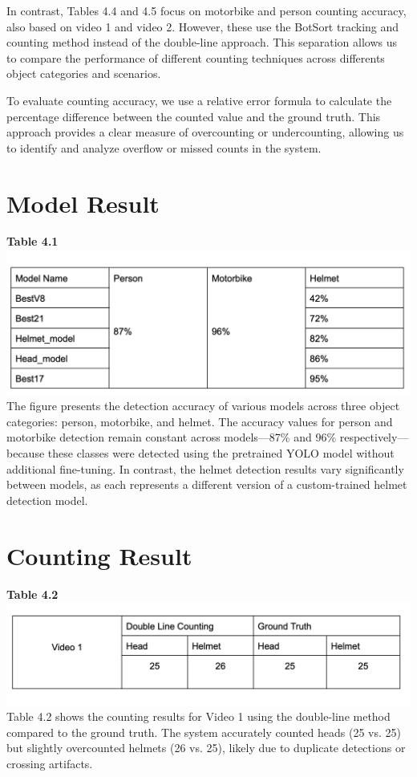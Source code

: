 \vspace{1em}
In contrast, Tables 4.4 and 4.5 focus on motorbike and person counting accuracy, also based on video 1 and video 2. However, these use the BotSort tracking and counting method instead of the double-line approach. This separation allows us to compare the performance of different counting techniques across differents object categories and scenarios.

\vspace{1em}
To evaluate counting accuracy, we use a relative error formula to calculate the percentage difference between the counted value and the ground truth. This approach provides a clear measure of overcounting or undercounting, allowing us to identify and analyze overflow or missed counts in the system.


\section{Model Result}
\noindent\textbf{Table 4.1} \\
\includegraphics[width=1\textwidth]{model_result.png}
The figure presents the detection accuracy of various models across three object categories: person, motorbike, and helmet. The accuracy values for person and motorbike detection remain constant across models—87\% and 96\% respectively—because these classes were detected using the pretrained YOLO model without additional fine-tuning. In contrast, the helmet detection results vary significantly between models, as each represents a different version of a custom-trained helmet detection model.
\section{Counting Result}
\vspace{0.5em}
\noindent\textbf{Table 4.2} \\
\includegraphics[width=1\textwidth]{test1.png}
Table 4.2 shows the counting results for Video 1 using the double-line method compared to the ground truth. The system accurately counted heads (25 vs. 25) but slightly overcounted helmets (26 vs. 25), likely due to duplicate detections or crossing artifacts.


